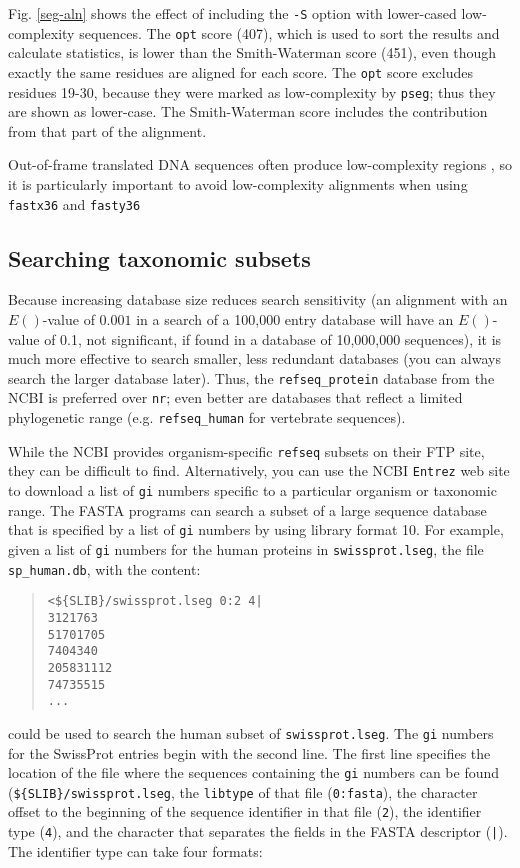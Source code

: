 \documentclass[11pt]{article}
\begin{document}
Fig. \ref{seg-aln} shows the effect of including the \texttt{-S}
option with lower-cased low-complexity sequences.  The \texttt{opt}
score (407), which is used to sort the results and calculate
statistics, is lower than the Smith-Waterman score (451), even though
exactly the same residues are aligned for each score. The \texttt{opt}
score excludes residues 19-30, because they were marked as
low-complexity by \texttt{pseg}; thus they are shown as lower-case.
The Smith-Waterman score includes the contribution from that part of
the alignment.

Out-of-frame translated DNA sequences often produce low-complexity
regions \cite{wrp973}, so it is particularly important to avoid
low-complexity alignments when using \texttt{fastx36} and
\texttt{fasty36}

\subsection{Searching taxonomic subsets}

Because increasing database size reduces search sensitivity (an
alignment with an $E()$-value of $0.001$ in a search of a 100,000
entry database will have an $E()$-value of 0.1, not significant, if
found in a database of 10,000,000 sequences), it is much more
effective to search smaller, less redundant databases (you can always
search the larger database later).  Thus, the \texttt{refseq\_protein}
database from the NCBI is preferred over \texttt{nr}; even better are
databases that reflect a limited phylogenetic range
(e.g. \texttt{refseq\_human} for vertebrate sequences).

While the NCBI provides organism-specific \texttt{refseq} subsets on
their FTP site, they can be difficult to find.  Alternatively, you can
use the NCBI \texttt{Entrez} web site to download a list of
\texttt{gi} numbers specific to a particular organism or taxonomic
range. The FASTA programs can search a subset of a large sequence
database that is specified by a list of \texttt{gi} numbers by using
library format 10.  For example, given a list of \texttt{gi} numbers
for the human proteins in \texttt{swissprot.lseg}, the file
\texttt{sp\_human.db}, with the content:
\begin{quote}
\begin{verbatim}
<${SLIB}/swissprot.lseg 0:2 4|
3121763
51701705
7404340
205831112
74735515
...
\end{verbatim}
\end{quote}
could be used to search the human subset of
\texttt{swissprot.lseg}. The \texttt{gi} numbers for the SwissProt
entries begin with the second line. The first line specifies the
location of the file where the sequences containing the \texttt{gi}
numbers can be found (\texttt{\$\{SLIB\}/swissprot.lseg}, the
\texttt{libtype} of that file (\texttt{0:fasta}), the character offset
to the beginning of the sequence identifier in that file (\texttt{2}),
the identifier type (\texttt{4}), and the character
that separates the fields in the FASTA descriptor (\texttt{|}).  The
identifier type can take four formats:
\end{document}
